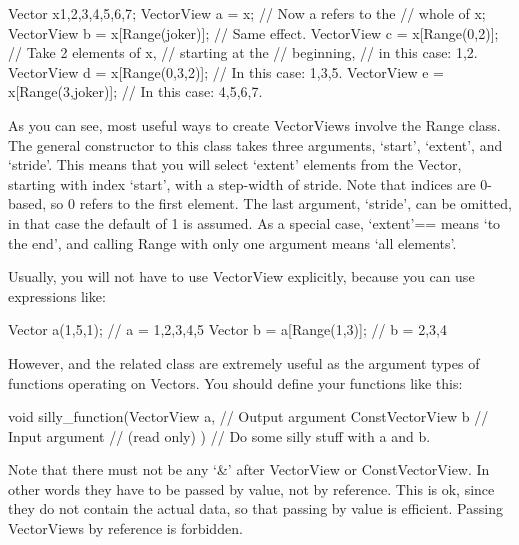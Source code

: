 \begin{code}
Vector x{1,2,3,4,5,6,7};
VectorView a = x;                 // Now a refers to the 
                                  // whole of x;
VectorView b = x[Range(joker)];   // Same effect.
VectorView c = x[Range(0,2)];     // Take 2 elements of x, 
                                  // starting at the 
                                  // beginning,
                                  // in this case: 1,2.
VectorView d = x[Range(0,3,2)];   // In this case: 1,3,5.
VectorView e = x[Range(3,joker)]; // In this case: 4,5,6,7.
\end{code}

As you can see, most useful ways to create VectorViews involve the
Range class. The general constructor to this class takes three
arguments, `start', `extent', and `stride'. This means that you will
select `extent' elements from the Vector, starting with index `start',
with a step-width of stride. Note that indices are 0-based, so 0
refers to the first element. The last argument, `stride', can be
omitted, in that case the default of 1 is assumed. As a special case,
`extent'== means `to the end', and calling Range with only one
argument  means `all elements'.

Usually, you will not have to use VectorView explicitly, because you
can use expressions like:

\begin{code}
Vector a(1,5,1);                // a = 1,2,3,4,5
Vector b = a[Range(1,3)];       // b = 2,3,4
\end{code}

However,  and the related class
 are extremely useful as the argument types of
functions operating on Vectors. You should define your functions like
this:

\begin{code}
void silly_function(VectorView a,      // Output argument
                    ConstVectorView b  // Input argument
                                       // (read only)
                   )
{
   // Do some silly stuff with a and b.
}
\end{code}

Note that there must not be any `\&' after VectorView or
ConstVectorView. In other words they have to be passed by value, not
by reference. This is ok, since they do not contain the actual
data, so that passing by value is efficient. Passing VectorViews by
reference is forbidden.

